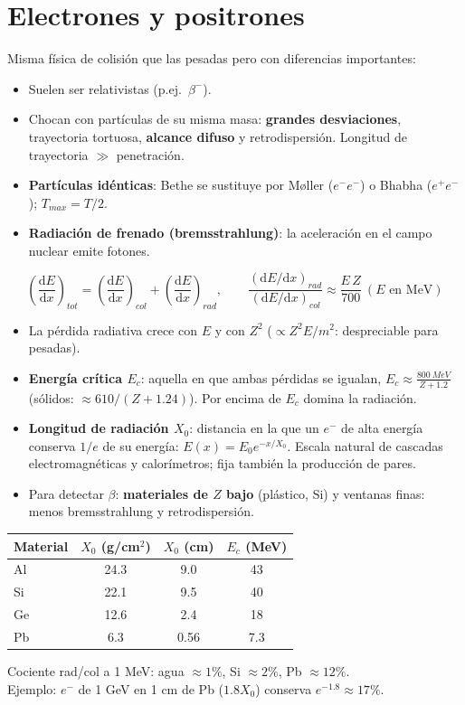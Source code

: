 \section{Electrones y positrones}
Misma física de colisión que las pesadas pero con diferencias importantes:
\begin{itemize}
\item Suelen ser relativistas (p.ej.\ $\beta^-$).
\item Chocan con partículas de su misma masa: \textbf{grandes desviaciones}, trayectoria tortuosa,
\textbf{alcance difuso} y retrodispersión. Longitud de trayectoria $\gg$ penetración.
\item \textbf{Partículas idénticas}: Bethe se sustituye por Møller ($e^-e^-$) o Bhabha ($e^+e^-$); $T_{max}=T/2$.
\item \textbf{Radiación de frenado (bremsstrahlung)}: la aceleración en el campo nuclear emite fotones.
\end{itemize}

\begin{clave}
\[
\left(\frac{\mathrm{d}E}{\mathrm{d}x}\right)_{tot}=\left(\frac{\mathrm{d}E}{\mathrm{d}x}\right)_{col}+\left(\frac{\mathrm{d}E}{\mathrm{d}x}\right)_{rad},
\qquad
\frac{(\mathrm{d}E/\mathrm{d}x)_{rad}}{(\mathrm{d}E/\mathrm{d}x)_{col}}\approx\frac{E\,Z}{700}\ (E\text{ en MeV})
\]
\begin{itemize}
\item La pérdida radiativa crece con $E$ y con $Z^2$ ($\propto Z^2E/m^2$: despreciable para pesadas).
\item \textbf{Energía crítica $E_c$}: aquella en que ambas pérdidas se igualan, $E_c\approx\frac{\SI{800}{MeV}}{Z+1.2}$
(sólidos: $\approx 610/(Z+1.24)$). Por encima de $E_c$ domina la radiación.
\item \textbf{Longitud de radiación $X_0$}: distancia en la que un $e^-$ de alta energía conserva $1/e$ de su energía:
$E(x)=E_0e^{-x/X_0}$. Escala natural de cascadas electromagnéticas y calorímetros; fija también la producción de pares.
\item Para detectar $\beta$: \textbf{materiales de $Z$ bajo} (plástico, Si) y ventanas finas: menos bremsstrahlung y retrodispersión.
\end{itemize}
\end{clave}

\begin{dato}[$X_0$ y $E_c$]
\begin{tabular}{lccc}
\toprule
Material & $X_0$ (g/cm$^2$) & $X_0$ (cm) & $E_c$ (MeV)\\
\midrule
Al & 24.3 & 9.0 & 43\\ Si & 22.1 & 9.5 & 40\\ Ge & 12.6 & 2.4 & 18\\ Pb & 6.3 & 0.56 & 7.3\\
\bottomrule
\end{tabular}\quad
Cociente rad/col a 1 MeV: agua $\approx1\%$, Si $\approx2\%$, Pb $\approx12\%$.\\
Ejemplo: $e^-$ de 1 GeV en 1 cm de Pb ($1.8X_0$) conserva $e^{-1.8}\approx17\%$.
\end{dato}

